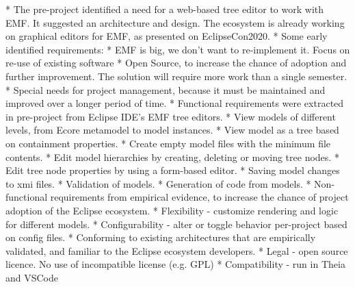 * The pre-project identified a need for a web-based tree editor to work with EMF. It suggested an architecture and design. The ecosystem is already working on graphical editors for EMF, as presented on EclipseCon2020.
  * Some early identified requirements:
    * EMF is big, we don't want to re-implement it. Focus on re-use of existing software
    * Open Source, to increase the chance of adoption and further improvement. The solution will require more work than a single semester.
    * Special needs for project management, because it must be maintained and improved over a longer period of time.
  * Functional requirements were extracted in pre-project from Eclipse IDE's EMF tree editors.
    * View models of different levels, from Ecore metamodel to model instances.
    * View model as a tree based on containment properties.
    * Create empty model files with the minimum file contents.
    * Edit model hierarchies by creating, deleting or moving tree nodes.
    * Edit tree node properties by using a form-based editor.
    * Saving model changes to xmi files.
    * Validation of models.
    * Generation of code from models.
  * Non-functional requirements from empirical evidence, to increase the chance of project adoption of the Eclipse ecosystem.
    * Flexibility - customize rendering and logic for different models.
    * Configurability - alter or toggle behavior per-project based on config files.
    * Conforming to existing architectures that are empirically validated, and familiar to the Eclipse ecosystem developers.
    * Legal - open source licence. No use of incompatible license (e.g. GPL)
    * Compatibility - run in Theia and VSCode



